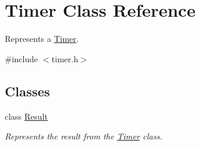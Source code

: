 \hypertarget{classTimer}{\section{Timer Class Reference}
\label{classTimer}
}


Represents a \hyperlink{classTimer}{Timer}.  




{\ttfamily \#include $<$timer.\-h$>$}

\subsection*{Classes}
\begin{DoxyCompactItemize}
\item 
class \hyperlink{classTimer_1_1Result}{Result}
\begin{DoxyCompactList}\small\item\em Represents the result from the \hyperlink{classTimer}{Timer} class. \end{DoxyCompactList}\end{DoxyCompactItemize}
